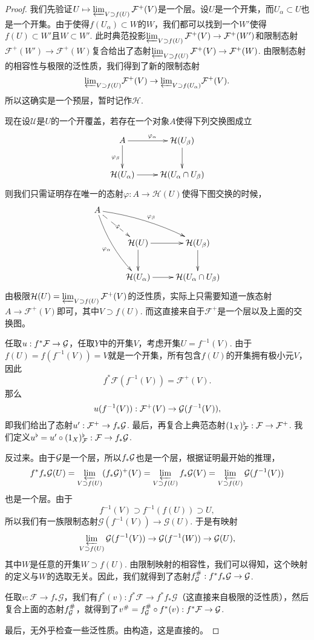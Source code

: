 \begin{proof}
	我们先验证$U\mapsto \varprojlim_{V\supset f(U)} \mathcal{F}^+(V)$是一个层。设$U$是一个开集，而$U_\alpha\subset U$也是一个开集。由于使得$f(U_\alpha)\subset W$的$W$，我们都可以找到一个$W'$使得$f(U)\subset W'$且$W\subset W'$. 此时典范投影$\varprojlim_{V\supset f(U)} \mathcal{F}^+(V)\to \mathcal{F}^+(W')$和限制态射$\mathcal{F}^+(W')\to \mathcal{F}^+(W)$复合给出了态射$\varprojlim_{V\supset f(U)} \mathcal{F}^+(V)\to \mathcal{F}^+(W)$. 由限制态射的相容性与极限的泛性质，我们得到了新的限制态射
	\[
	{\varprojlim}_{V\supset f(U)} \mathcal{F}^+(V)\to {\varprojlim}_{V\supset f(U_\alpha)} \mathcal{F}^+(V).
	\]
	所以这确实是一个预层，暂时记作$\mathcal{H}$.

	现在设$\mathscr{U}$是$U$的一个开覆盖，若存在一个对象$A$使得下列交换图成立
	\[
	\xymatrix{
		A\ar[r]^{\varphi_{\alpha}}\ar[d]_{\varphi_{\beta}}&\mathcal{H}(U_\beta)\ar[d]\\
		\mathcal{H}(U_\alpha)\ar[r]&\mathcal{H}(U_{\alpha}\cap U_{\beta})
	}
	\]
	则我们只需证明存在唯一的态射$\varphi:A\to \mathcal{H}(U)$使得下图交换的时候，
	\[
		\xymatrix{
			A\ar@/_/[ddr]_{\varphi_{\alpha}}\ar@/^/[drr]^{\varphi_{\beta}}\ar@{-->}[dr]|{\varphi}&& \\
			&\mathcal{H}(U)\ar[r]\ar[d]&\mathcal{H}(U_\beta)\ar[d]\\
			&\mathcal{H}(U_\alpha)\ar[r]&\mathcal{H}(U_{\alpha}\cap U_{\beta})
		}
	\]
	由极限$\mathcal{H}(U)=\varprojlim_{V\supset f(U)} \mathcal{F}^+(V)$的泛性质，实际上只需要知道一族态射$A\to \mathcal{F}^+(V)$即可，其中$V\supset f(U)$. 而这直接来自于$\mathcal{F}^+$是一个层以及上面的交换图。

	任取$u:f^*\mathcal{F}\to\mathcal{G}$，任取$Y$中的开集$V$，考虑开集$U=f^{-1}(V)$. 由于$f(U)=f(f^{-1}(V))=V$就是一个开集，所有包含$f(U)$的开集拥有极小元$V$，因此
	\[
	f^*\mathcal{F}(f^{-1}(V))=\mathcal{F}^+(V).
	\]
	那么
	\[
	u(f^{-1}(V)):\mathcal{F}^+(V)\to \mathcal{G}(f^{-1}(V)),
	\]
	即我们给出了态射$u':\mathcal{F}^+\to f_*\mathcal{G}$. 最后，再复合上典范态射$(1_X)^\flat_{\mathcal{F}}:\mathcal{F} \to \mathcal{F}^+$. 我们定义$u^\flat=u'\circ (1_X)^\flat_{\mathcal{F}}: \mathcal{F}\to f_*\mathcal{G}$.

	反过来。由于$\mathcal{G}$是一个层，所以$f_*\mathcal{G}$也是一个层，根据证明最开始的推理，
	\[
		f^*f_*\mathcal{G}(U)=\varprojlim_{V\supset f(U)} (f_*\mathcal{G})^+(V)=\varprojlim_{V\supset f(U)} f_*\mathcal{G}(V)=\varprojlim_{V\supset f(U)} \mathcal{G}(f^{-1}(V))
	\]
	也是一个层。由于
	\[
	f^{-1}(V)\supset f^{-1}(f(U))\supset U,
	\]
	所以我们有一族限制态射$\mathcal{G}(f^{-1}(V))\to \mathcal{G}(U)$. 于是有映射
	\[
	\varprojlim_{V\supset f(U)} \mathcal{G}(f^{-1}(V))\to \mathcal{G}(f^{-1}(W))\to \mathcal{G}(U),
	\]
	其中$W$是任意的开集$W\supset f(U)$. 由限制映射的相容性，我们可以得知，这个映射的定义与$W$的选取无关。因此，我们就得到了态射$f^\#_{\mathcal{G}}:f^*f_*\mathcal{G}\to \mathcal{G}$.

	任取$v:\mathcal{F}\to f_*\mathcal{G}$，我们有$f^*(v):f^*\mathcal{F}\to f^*f_*\mathcal{G}$（这直接来自极限的泛性质），然后复合上面的态射$f^\#_{\mathcal{G}}$，就得到了$v^\#=f^\#_{\mathcal{G}}\circ f^*(v):f^*\mathcal{F}\to \mathcal{G}$.

	最后，无外乎检查一些泛性质。由构造，这是直接的。
\end{proof}

